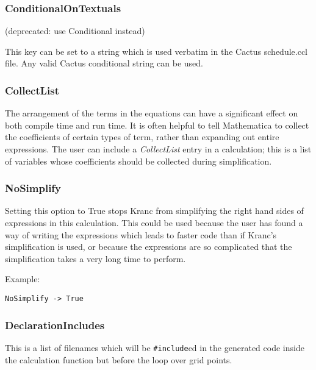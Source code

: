 \documentclass{report}
\begin{document}
\subsubsection{ConditionalOnTextuals}

(deprecated: use Conditional instead)

This key can be set to a string which is used verbatim in the Cactus
schedule.ccl file.  Any valid Cactus conditional string can be used.

\subsubsection{CollectList}

The arrangement of the terms in the equations can have a significant
effect on both compile time and run time.  It is often helpful to tell
Mathematica to collect the coefficients of certain types of term,
rather than expanding out entire expressions.  The user can include a
{\em CollectList} entry in a calculation; this is a list of variables
whose coefficients should be collected during simplification.

\subsubsection{NoSimplify}

Setting this option to True stops Kranc from simplifying the right
hand sides of expressions in this calculation.  This could be used
because the user has found a way of writing the expressions which
leads to faster code than if Kranc's simplification is used, or
because the expressions are so complicated that the simplification
takes a very long time to perform.

Example:

\begin{center}
\begin{minipage}{0.8 \textwidth}
\begin{verbatim}
NoSimplify -> True
\end{verbatim}
\end{minipage}
\end{center}

\subsubsection{DeclarationIncludes}

This is a list of filenames which will be \verb|#include|ed in the
generated code inside the calculation function but before the loop
over grid points.
\end{document}
